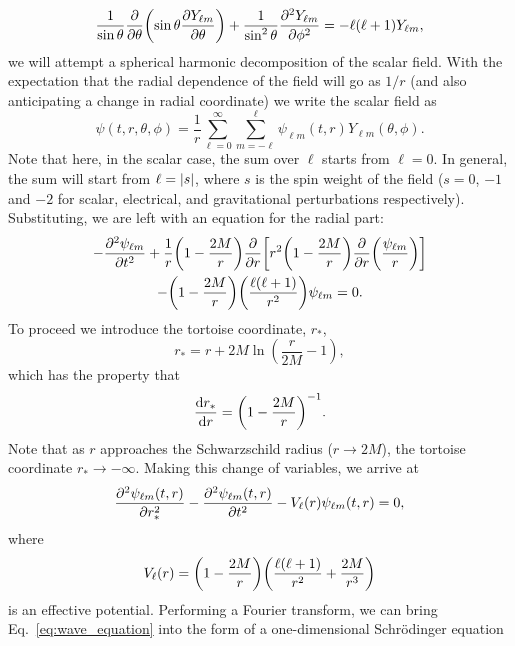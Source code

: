 \begin{equation}
    \frac{1}{\sin{\theta}} \pdv{\theta} \qty(\sin{\theta} \pdv{Y_{\ell m}}{\theta} ) + \frac{1}{\sin^2{\theta}} \pdv[2]{Y_{\ell m}}{\phi} = - \ell (\ell + 1) Y_{\ell m},
\end{equation}
we will attempt a spherical harmonic decomposition of the scalar field. 
With the expectation that the radial dependence of the field will go as $1/r$ (and also anticipating a change in radial coordinate) we write the scalar field as
\begin{equation}
    \psi(t, r, \theta, \phi) = \frac{1}{r} \sum_{\ell = 0}^\infty \sum_{m = -\ell}^\ell \psi_{\ell m}(t, r) Y_{\ell m}(\theta, \phi).
\end{equation}
Note that here, in the scalar case, the sum over $\ell$ starts from $\ell = 0$.
In general, the sum will start from $\ell = \abs{s}$, where $s$ is the spin weight of the field ($s=0$, $-1$ and $-2$ for scalar, electrical, and gravitational perturbations respectively).
Substituting, we are left with an equation for the radial part:
\begin{multline}
    - \pdv[2]{\psi_{\ell m}}{t} + \frac{1}{r} \qty(1 - \frac{2M}{r}) \pdv{r} \qty[r^2 \qty(1 - \frac{2M}{r}) \pdv{r}\qty(\frac{\psi_{\ell m}}{r}) ]\\
    - \qty(1 - \frac{2M}{r}) \qty(\frac{\ell (\ell + 1)}{r^2}) \psi_{\ell m} = 0.
\end{multline}
To proceed we introduce the tortoise coordinate, $r_*$,
\begin{equation}
    r_* = r + 2M \ln(\frac{r}{2M} - 1),
\end{equation}
which has the property that
\begin{equation}
    \dv{r_*}{r} = \qty( 1 - \frac{2M}{r} )^{-1}.
\end{equation}
Note that as $r$ approaches the Schwarzschild radius ($r \rightarrow 2M$), the tortoise coordinate $r_* \rightarrow -\infty$.
Making this change of variables, we arrive at
\begin{equation}\label{eq:wave_equation}
    \pdv[2]{\psi_{\ell m}(t,r)}{r_*} - \pdv[2]{\psi_{\ell m}(t,r)}{t} - V_\ell(r) \psi_{\ell m}(t,r) = 0,
\end{equation}
where
\begin{equation}
    V_\ell(r) = \qty( 1 - \frac{2M}{r} ) \qty( \frac{\ell (\ell + 1)}{r^2} + \frac{2M}{r^3} )
\end{equation}
is an effective potential.
Performing a Fourier transform, we can bring Eq.~\ref{eq:wave_equation} into the form of a one-dimensional Schr\"{o}dinger equation
